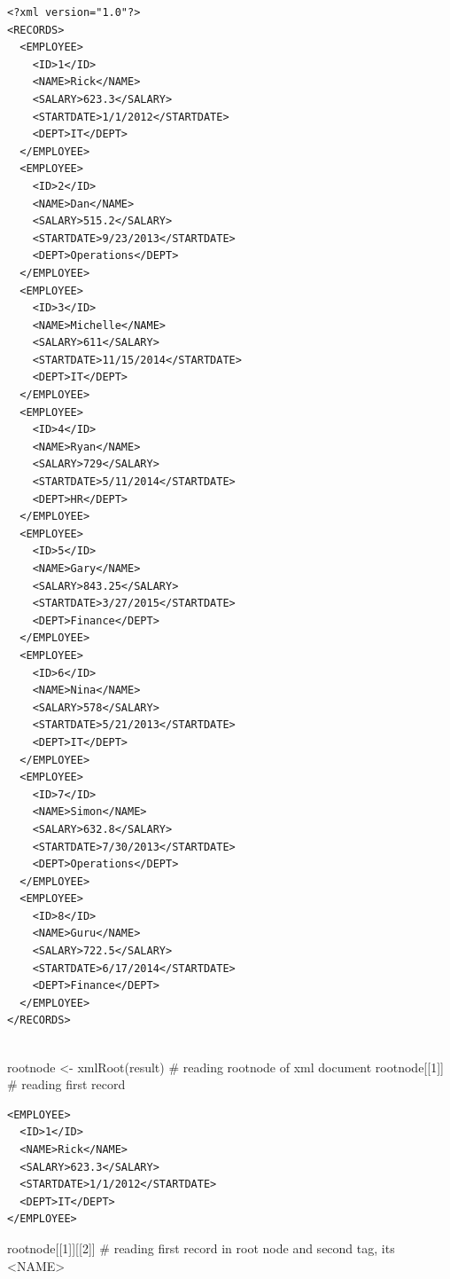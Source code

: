 \documentclass[
  letterpaper,
  DIV=11,
  numbers=noendperiod]{scrreprt}
\newenvironment{Shaded}{\begin{snugshade}}{\end{snugshade}}
\newcommand{\CommentTok}[1]{\textcolor[rgb]{0.37,0.37,0.37}{#1}}
\newcommand{\DecValTok}[1]{\textcolor[rgb]{0.68,0.00,0.00}{#1}}
\newcommand{\FunctionTok}[1]{\textcolor[rgb]{0.28,0.35,0.67}{#1}}
\newcommand{\NormalTok}[1]{\textcolor[rgb]{0.00,0.23,0.31}{#1}}
\newcommand{\OtherTok}[1]{\textcolor[rgb]{0.00,0.23,0.31}{#1}}
\begin{document}
\begin{verbatim}
<?xml version="1.0"?>
<RECORDS>
  <EMPLOYEE>
    <ID>1</ID>
    <NAME>Rick</NAME>
    <SALARY>623.3</SALARY>
    <STARTDATE>1/1/2012</STARTDATE>
    <DEPT>IT</DEPT>
  </EMPLOYEE>
  <EMPLOYEE>
    <ID>2</ID>
    <NAME>Dan</NAME>
    <SALARY>515.2</SALARY>
    <STARTDATE>9/23/2013</STARTDATE>
    <DEPT>Operations</DEPT>
  </EMPLOYEE>
  <EMPLOYEE>
    <ID>3</ID>
    <NAME>Michelle</NAME>
    <SALARY>611</SALARY>
    <STARTDATE>11/15/2014</STARTDATE>
    <DEPT>IT</DEPT>
  </EMPLOYEE>
  <EMPLOYEE>
    <ID>4</ID>
    <NAME>Ryan</NAME>
    <SALARY>729</SALARY>
    <STARTDATE>5/11/2014</STARTDATE>
    <DEPT>HR</DEPT>
  </EMPLOYEE>
  <EMPLOYEE>
    <ID>5</ID>
    <NAME>Gary</NAME>
    <SALARY>843.25</SALARY>
    <STARTDATE>3/27/2015</STARTDATE>
    <DEPT>Finance</DEPT>
  </EMPLOYEE>
  <EMPLOYEE>
    <ID>6</ID>
    <NAME>Nina</NAME>
    <SALARY>578</SALARY>
    <STARTDATE>5/21/2013</STARTDATE>
    <DEPT>IT</DEPT>
  </EMPLOYEE>
  <EMPLOYEE>
    <ID>7</ID>
    <NAME>Simon</NAME>
    <SALARY>632.8</SALARY>
    <STARTDATE>7/30/2013</STARTDATE>
    <DEPT>Operations</DEPT>
  </EMPLOYEE>
  <EMPLOYEE>
    <ID>8</ID>
    <NAME>Guru</NAME>
    <SALARY>722.5</SALARY>
    <STARTDATE>6/17/2014</STARTDATE>
    <DEPT>Finance</DEPT>
  </EMPLOYEE>
</RECORDS>
 
\end{verbatim}

\begin{Shaded}
\begin{Highlighting}[]
\NormalTok{rootnode }\OtherTok{\textless{}{-}} \FunctionTok{xmlRoot}\NormalTok{(result) }\CommentTok{\# reading rootnode of xml document}
\NormalTok{rootnode[[}\DecValTok{1}\NormalTok{]] }\CommentTok{\# reading first record}
\end{Highlighting}
\end{Shaded}

\begin{verbatim}
<EMPLOYEE>
  <ID>1</ID>
  <NAME>Rick</NAME>
  <SALARY>623.3</SALARY>
  <STARTDATE>1/1/2012</STARTDATE>
  <DEPT>IT</DEPT>
</EMPLOYEE> 
\end{verbatim}

\begin{Shaded}
\begin{Highlighting}[]
\NormalTok{rootnode[[}\DecValTok{1}\NormalTok{]][[}\DecValTok{2}\NormalTok{]] }\CommentTok{\# reading first record in root node and second tag, its \textless{}NAME\textgreater{}}
\end{Highlighting}
\end{Shaded}
\end{document}
